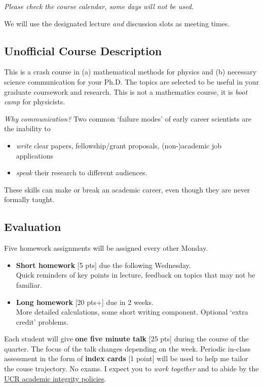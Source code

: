 \documentclass[12pt]{article}
\numberwithin{equation}{section}    %
\begin{document}
\vspace{.5em}
\noindent \emph{Please check the course calendar, some days will not be used.}

\vspace{.5em}
\noindent We will use the designated lecture \emph{and} discussion slots as meeting times. 


\subsection*{Unofficial Course Description}


This is a crash course in (a) mathematical methods for physics and (b) necessary science communication for your Ph.D. The topics are selected to be useful in your graduate coursework and research. This is not a mathematics course, it is \emph{boot camp} for physicists. 

\vspace{.5em}
\noindent\emph{Why communication?} Two common `failure modes' of early career scientists are the inability to \begin{itemize}
	\item \emph{write} clear papers, fellowship/grant proposals, (non-)academic job applications
	\item \emph{speak} their research to different audiences.
\end{itemize} 
These skills can make or break an academic career, even though they are never formally taught. 

\subsection*{Evaluation}

Five homework assignments will be assigned every other Monday.
\begin{itemize}
	\item \textbf{Short homework} [5 pts] due the following Wednesday.\\ 
		Quick reminders of key points in lecture, feedback on topics that may not be familiar.
	\item \textbf{Long homework} [20 pts+] due in 2 weeks.\\ 
		More detailed calculations, some short writing component. Optional `extra credit' problems.
\end{itemize}
\noindent
Each student will give \textbf{one five minute talk} [25 pts] during the course of the quarter. The focus of the talk changes depending on the week. Periodic in-class assessment in the form of \textbf{index cards} [1 point] will be used to help me tailor the couse trajectory. No exams. I expect you to \emph{work together} and to abide by the \href{http://conduct.ucr.edu/policies/academicintegrity.html}{UCR academic integrity policies}.
\end{document}
